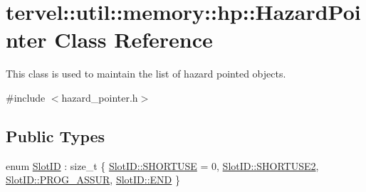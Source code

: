 \hypertarget{classtervel_1_1util_1_1memory_1_1hp_1_1_hazard_pointer}{}\section{tervel\+:\+:util\+:\+:memory\+:\+:hp\+:\+:Hazard\+Pointer Class Reference}
\label{classtervel_1_1util_1_1memory_1_1hp_1_1_hazard_pointer}


This class is used to maintain the list of hazard pointed objects.  




{\ttfamily \#include $<$hazard\+\_\+pointer.\+h$>$}

\subsection*{Public Types}
\begin{DoxyCompactItemize}
\item 
enum \hyperlink{classtervel_1_1util_1_1memory_1_1hp_1_1_hazard_pointer_a390f6869150121a40b300b955198b897}{Slot\+I\+D} \+: size\+\_\+t \{ \hyperlink{classtervel_1_1util_1_1memory_1_1hp_1_1_hazard_pointer_a390f6869150121a40b300b955198b897abd1604d15b78c5756539716cce5a8630}{Slot\+I\+D\+::\+S\+H\+O\+R\+T\+U\+S\+E} = 0, 
\hyperlink{classtervel_1_1util_1_1memory_1_1hp_1_1_hazard_pointer_a390f6869150121a40b300b955198b897ac661068f021187b485d8673a518a8518}{Slot\+I\+D\+::\+S\+H\+O\+R\+T\+U\+S\+E2}, 
\hyperlink{classtervel_1_1util_1_1memory_1_1hp_1_1_hazard_pointer_a390f6869150121a40b300b955198b897aea3e00804dede57f637602af17ce4388}{Slot\+I\+D\+::\+P\+R\+O\+G\+\_\+\+A\+S\+S\+U\+R}, 
\hyperlink{classtervel_1_1util_1_1memory_1_1hp_1_1_hazard_pointer_a390f6869150121a40b300b955198b897ab1a326c06d88bf042f73d70f50197905}{Slot\+I\+D\+::\+E\+N\+D}
 \}
\end{DoxyCompactItemize}
